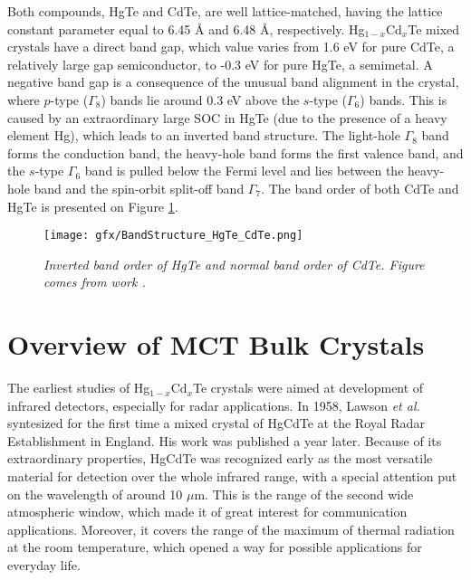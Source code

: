 \documentclass[titlepage,a4paper]{book}
\newcommand{\wciecie}{\quad\phantom{v}}
\begin{document}
Both compounds, HgTe and CdTe, are well lattice-matched, having the lattice constant parameter equal to 6.45 Å and 6.48 Å, respectively. Hg$_{1-x}$Cd$_x$Te mixed crystals have a direct band gap, which value varies from 1.6 eV for pure CdTe, a relatively large gap semiconductor, to -0.3 eV for pure HgTe, a semimetal. A negative band gap is a consequence of the unusual band alignment in the crystal, where $p$-type ($\Gamma_8$) bands lie around 0.3 eV above the $s$-type ($\Gamma_6$) bands. This is caused by an extraordinary large SOC in HgTe (due to the presence of a heavy element Hg), which leads to an inverted band structure. The light-hole $\Gamma_8$ band forms the conduction band, the heavy-hole band forms the first valence band, and the $s$-type $\Gamma_6$ band is pulled below the Fermi level and lies between the heavy-hole band and the spin-orbit split-off band $\Gamma_7$. The band order of both CdTe and HgTe is presented on Figure \ref{fig:BandStructure_HgTe_CdTe}.

\begin{figure}[H]
	\centering
	\texttt{[image: gfx/BandStructure\_HgTe\_CdTe.png]}
	\vspace{-10pt}
	\caption{\textit{Inverted band order of HgTe and normal band order of CdTe. Figure comes from work \cite{Bernevig_Topology2}.}}
	\label{fig:BandStructure_HgTe_CdTe}
\end{figure} 


\section{Overview of MCT Bulk Crystals}
\wciecie
The earliest studies of Hg$_{1-x}$Cd$_x$Te crystals were aimed at development of infrared detectors, especially for radar applications. In 1958, Lawson \textit{et al.} syntesized for the first time a mixed crystal of HgCdTe at the Royal Radar Establishment in England. His work was published \cite{Lawson_MCT} a year later. Because of its extraordinary properties, HgCdTe was recognized early as the most versatile material for detection over the whole infrared range, with a special attention put on the wavelength of around 10 $\mu$m. This is the range of the second wide atmospheric window, which made it of great interest for communication applications. Moreover, it covers the range of the maximum of thermal radiation at the room temperature, which opened a way for possible applications for everyday life. 
\end{document}
